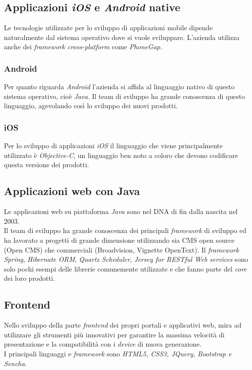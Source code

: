\subsection{Applicazioni \emph{iOS} e \emph{Android} native}
Le tecnologie utilizzate per lo sviluppo di applicazioni mobile dipende naturalmente dal sistema operativo dove si vuole sviluppare. L'azienda utilizza anche dei \emph{framework cross-platform} come \emph{PhoneGap}.
\subsubsection{Android}
Per quanto riguarda \emph{Android} l'azienda si affida al linguaggio nativo di questo sistema operativo, cioè \emph{Java}. 
Il team di sviluppo ha grande conoscenza di questo linguaggio, agevolando così lo sviluppo dei nuovi prodotti.
\subsubsection{iOS}
Per lo sviluppo di applicazioni \emph{iOS} il linguaggio che viene principalmente utilizzato è \emph{Objective-C}, un linguaggio ben noto a coloro che devono codificare questa versione dei prodotti.

\subsection{Applicazioni web con Java}
Le applicazioni web su piattaforma \emph{Java} sono nel DNA di \azienda{} fin dalla nascita nel 2003. \\
Il team di sviluppo ha grande conoscenza dei principali \emph{framework} di sviluppo ed ha lavorato a progetti di grande dimensione utilizzando sia CMS open source (Open CMS) che commerciali (Broadvision, Vignette OpenText).
Il \emph{framework} \emph{Spring}, \emph{Hibernate ORM}, \emph{Quartz Scheduler},\emph{ Jersey for RESTful Web services} sono solo pochi esempi delle librerie comunemente utilizzate e che fanno parte del \emph{core} dei loro prodotti.

\subsection{Frontend}
Nello sviluppo della parte \emph{frontend} dei propri portali e applicativi web, \azienda{} mira ad utilizzare gli strumenti più innovativi per garantire la massima velocità di presentazione e la compatibilità con i \emph{device} di nuova generazione. \\
I principali linguaggi e \emph{framework} sono \emph{HTML5, CSS3, JQuery, Bootstrap e Sencha}.

